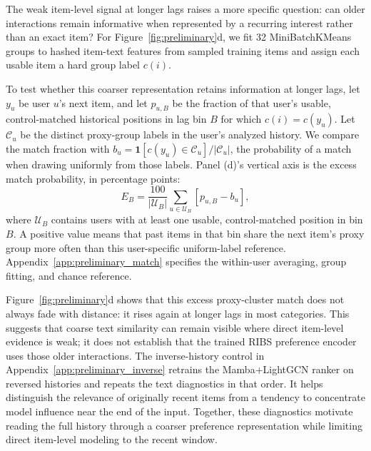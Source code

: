 \documentclass[11pt]{article}
\begin{document}
The weak item-level signal at longer lags raises a more specific question: can older interactions remain informative when represented by a recurring interest rather than an exact item? For Figure~\ref{fig:preliminary}d, we fit 32 MiniBatchKMeans groups to hashed item-text features from sampled training items and assign each usable item a hard group label $c(i)$. 

To test whether this coarser representation retains information at longer lags, let $y_u$ be user $u$'s next item, and let $p_{u,B}$ be the fraction of that user's usable, control-matched historical positions in lag bin $B$ for which $c(i)=c(y_u)$. Let $\mathcal C_u$ be the distinct proxy-group labels in the user's analyzed history. We compare the match fraction with $b_u=\mathbf{1}[c(y_u)\in\mathcal C_u]/|\mathcal C_u|$, the probability of a match when drawing uniformly from those labels. Panel (d)'s vertical axis is the excess match probability, in percentage points:
\begin{equation}
 E_B=\frac{100}{|\mathcal U_B|}\sum_{u\in\mathcal U_B}
 \left[p_{u,B}-b_u\right],
\end{equation}
where $\mathcal U_B$ contains users with at least one usable, control-matched position in bin $B$. A positive value means that past items in that bin share the next item's proxy group more often than this user-specific uniform-label reference. Appendix~\ref{app:preliminary_match} specifies the within-user averaging, group fitting, and chance reference.

Figure~\ref{fig:preliminary}d shows that this excess proxy-cluster match does not always fade with distance: it rises again at longer lags in most categories. This suggests that coarse text similarity can remain visible where direct item-level evidence is weak; it does not establish that the trained RIBS preference encoder uses those older interactions. The inverse-history control in Appendix~\ref{app:preliminary_inverse} retrains the Mamba+LightGCN ranker on reversed histories and repeats the text diagnostics in that order. It helps distinguish the relevance of originally recent items from a tendency to concentrate model influence near the end of the input. Together, these diagnostics motivate reading the full history through a coarser preference representation while limiting direct item-level modeling to the recent window.
\end{document}
